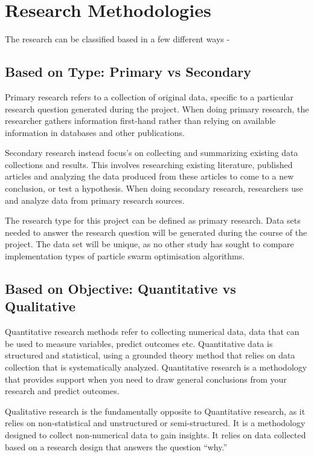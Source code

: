 \documentclass[oneside,12pt]{book}
\begin{document}
\section{Research Methodologies}
The research can be classified based in a few different ways -
\subsection{Based on Type: Primary vs Secondary}
Primary research refers to a collection of original data, specific to a particular research question generated during the project. When doing primary research, the researcher gathers information first-hand rather than relying on available information in databases and other publications.\cite{bouchrika_2020}

Secondary research instead focus's on collecting and summarizing existing data collections and results. This involves researching existing literature, published articles and analyzing the data produced from these articles to come to a new conclusion, or test a hypothesis. When doing secondary research, researchers use and analyze data from primary research sources.\cite{bouchrika_2020}

The research type for this project can be defined as primary research. Data sets needed to answer the research question will be generated during the course of the project. The data set will be unique, as no other study has sought to compare implementation types of particle swarm optimisation algorithms. 
\subsection{Based on Objective: Quantitative vs Qualitative}
Quantitative research methods refer to collecting numerical data, data that can be used to measure variables, predict outcomes etc. Quantitative data is structured and statistical, using a grounded theory method that relies on data collection that is systematically analyzed. Quantitative research is a methodology that provides support when you need to draw general conclusions from your research and predict outcomes.\cite{mcleod_2019}

Qualitative research is the fundamentally opposite to Quantitative research, as it relies on non-statistical and unstructured or semi-structured. It is a methodology designed to collect non-numerical data to gain insights. It relies on data collected based on a research design that answers the question “why.”\cite{survey_monkey}
\end{document}
